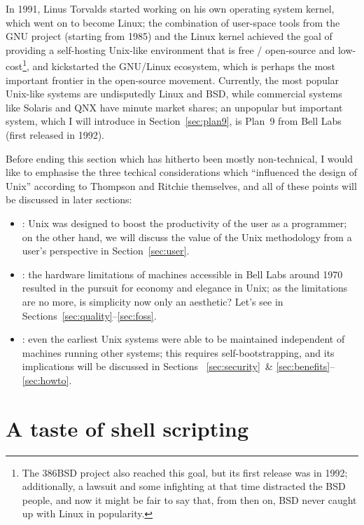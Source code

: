 In 1991, Linus Torvalds started working on his own operating system kernel,
which went on to become Linux; the combination of user-space tools from the
GNU project (starting from 1985) and the Linux kernel achieved the goal of
providing a self-hosting Unix-like environment that is free / open-source and
low-cost\footnote{The 386BSD project also reached this goal, but its first
release was in 1992; additionally, a lawsuit and some infighting at that
time distracted the BSD people, and now it might be
fair to say that, from then on, BSD never caught up with Linux in popularity.},
and kickstarted the GNU/Linux ecosystem, which is perhaps the most important
frontier in the open-source movement.  Currently, the most popular Unix-like
systems are undisputedly Linux and BSD, while commercial systems like Solaris
and QNX have minute market shares; an unpopular but important system,
which I will introduce in Section~\ref{sec:plan9}, is Plan~9
from Bell Labs (first released in 1992).

Before ending this section which has hitherto been mostly non-technical,
I would like to emphasise the three techical considerations which
``influenced the design of Unix'' according to Thompson and Ritchie
themselves, and all of these points
will be discussed in later sections:
\begin{itemize}
\item {}: Unix was designed to boost
	the productivity of the user as a programmer; on the other hand,
	we will discuss the value of the Unix methodology from
	a user's perspective in Section~\ref{sec:user}.
\item {}: the hardware limitations of machines accessible
	in Bell Labs around 1970 resulted in the pursuit for economy and elegance
	in Unix; as the limitations are no more, is simplicity now only an
	aesthetic?  Let's see in Sections~\ref{sec:quality}--\ref{sec:foss}.
\item {}: even the earliest Unix systems were able to be
	maintained independent of machines running other systems; this requires
	self-bootstrapping, and its implications will be discussed in Sections~%
	\ref{sec:security}~\& \ref{sec:benefits}--\ref{sec:howto}.
\end{itemize}

\section{A taste of shell scripting}\label{sec:shell}

